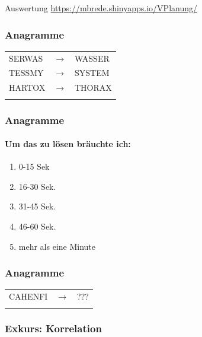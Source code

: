 \documentclass[
]{book}
\providecommand{\tightlist}{%
  \setlength{\itemsep}{0pt}\setlength{\parskip}{0pt}}
\begin{document}
Auswertung \href{hier}{https://mbrede.shinyapps.io/VPlanung/}

\hypertarget{anagramme}{%
\subsubsection{Anagramme}\label{anagramme}}

\begin{longtable}[]{@{}lll@{}}
\toprule
\endhead
SERWAS & \(\rightarrow\) & WASSER \\ \addlinespace
TESSMY & \(\rightarrow\) & SYSTEM \\ \addlinespace
HARTOX & \(\rightarrow\) & THORAX \\ \addlinespace
\bottomrule
\end{longtable}

\hypertarget{anagramme-1}{%
\subsubsection{Anagramme}\label{anagramme-1}}

\hypertarget{um-das-zu-luxf6sen-bruxe4uchte-ich}{%
\paragraph{Um das zu lösen bräuchte ich:}\label{um-das-zu-luxf6sen-bruxe4uchte-ich}}

\begin{enumerate}
\def\labelenumi{\Alph{enumi})}
\tightlist
\item
  0-15 Sek
\item
  16-30 Sek.
\item
  31-45 Sek.
\item
  46-60 Sek.
\item
  mehr als eine Minute
\end{enumerate}

\hypertarget{anagramme-2}{%
\subsubsection{Anagramme}\label{anagramme-2}}

\begin{longtable}[]{@{}lll@{}}
\toprule
\endhead
CAHENFI & \(\rightarrow\) & ??? \\ \addlinespace
\bottomrule
\end{longtable}

\hypertarget{exkurs-korrelation}{%
\subsubsection{Exkurs: Korrelation}\label{exkurs-korrelation}}
\end{document}
